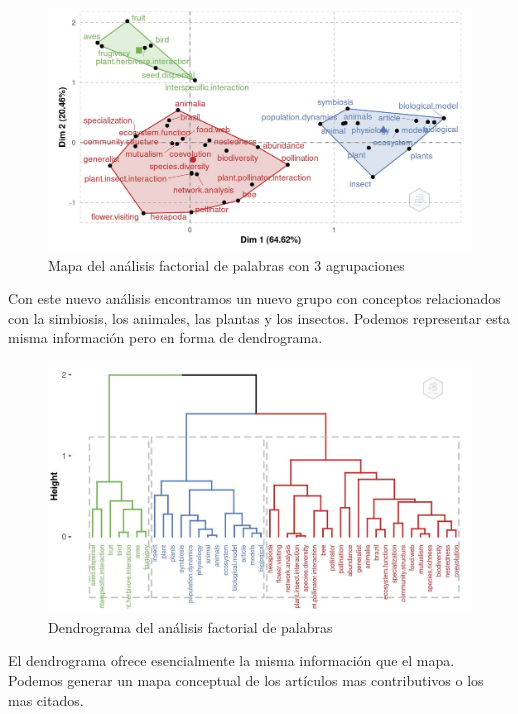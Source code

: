 \documentclass[
]{article}
\begin{document}
\begin{figure}
\centering
\includegraphics{MapaAnalisisFactorial3Grupos.JPG}
\caption{Mapa del análisis factorial de palabras con 3 agrupaciones}
\end{figure}

Con este nuevo análisis encontramos un nuevo grupo con conceptos
relacionados con la simbiosis, los animales, las plantas y los insectos.
Podemos representar esta misma información pero en forma de dendrograma.

\begin{figure}
\centering
\includegraphics{DendrogramaAnalisisFactorial.JPG}
\caption{Dendrograma del análisis factorial de palabras}
\end{figure}

El dendrograma ofrece esencialmente la misma información que el mapa.
Podemos generar un mapa conceptual de los artículos mas contributivos o
los mas citados.
\end{document}
